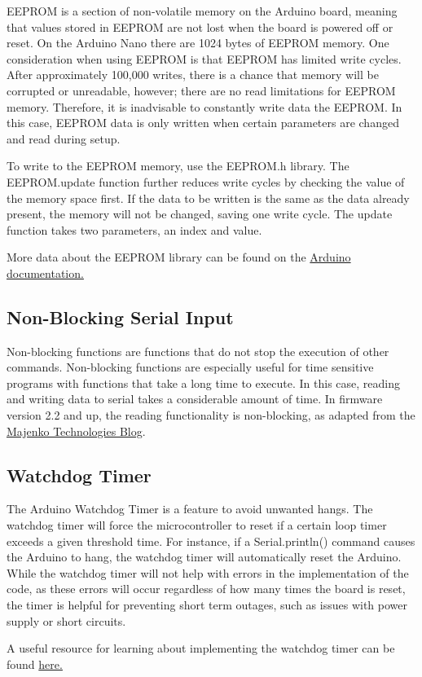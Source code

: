 \documentclass[11pt]{article} %
\begin{document}
EEPROM is a section of non-volatile memory on the Arduino board, meaning that values stored in EEPROM are not lost when the board is powered off or reset. On the Arduino Nano there are 1024 bytes of EEPROM memory. One consideration when using EEPROM is that EEPROM has limited write cycles. After approximately 100,000 writes, there is a chance that memory will be corrupted or unreadable, however; there are no read limitations for EEPROM memory. Therefore, it is inadvisable to constantly write data the EEPROM. In this case, EEPROM data is only written when certain parameters are changed and read during setup. 

To write to the EEPROM memory, use the EEPROM.h library. The EEPROM.update function further reduces write cycles by checking the value of the memory space first. If the data to be written is the same as the data already present, the memory will not be changed, saving one write cycle. The update function takes two parameters, an index and value. 

More data about the EEPROM library can be found on the \href{https://www.arduino.cc/en/Reference/EEPROM}{Arduino documentation.}

\subsection{Non-Blocking Serial Input}

Non-blocking functions are functions that do not stop the execution of other commands. Non-blocking functions are especially useful for time sensitive programs with functions that take a long time to execute. In this case, reading and writing data to serial takes a considerable amount of time. In firmware version 2.2 and up, the reading functionality is non-blocking, as adapted from the \href{https://hackingmajenkoblog.wordpress.com/2016/02/01/reading-serial-on-the-arduino/}{Majenko Technologies Blog}.


\subsection{Watchdog Timer}

The Arduino Watchdog Timer is a feature to avoid unwanted hangs. The watchdog timer will force the microcontroller to reset if a certain loop timer exceeds a given threshold time. For instance, if a Serial.println() command causes the Arduino to hang, the watchdog timer will automatically reset the Arduino. While the watchdog timer will not help with errors in the implementation of the code, as these errors will occur regardless of how many times the board is reset, the timer is helpful for preventing short term outages, such as issues with power supply or short circuits. 

A useful resource for learning about implementing the watchdog timer can be found \href{https://forum.arduino.cc/index.php?action=dlattach;topic=63651.0;attach=3585}{here.}
\end{document}

